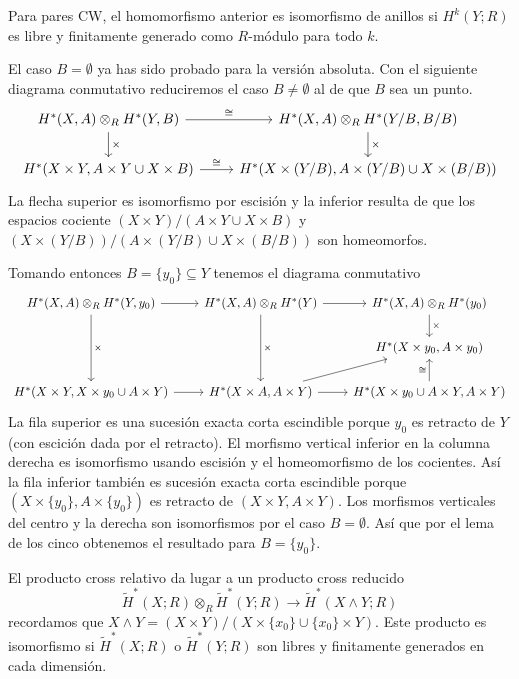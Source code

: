 \documentclass[TA.tex]{subfiles}
\begin{document}
\begin{teorema}
Para pares CW, el homomorfismo anterior es isomorfismo de anillos si $H^k(Y;R)$ es libre y finitamente generado como $R$-módulo para todo $k$. 
\end{teorema}
\begin{dem}
El caso $B=\emptyset$ ya has sido probado para la versión absoluta. Con el siguiente diagrama conmutativo reduciremos el caso $B\neq\emptyset$ al de que $B$ sea un punto. 
\[
\begin{tikzcd}
{H^*(X,A)\otimes_R H^*(Y,B) } \arrow[r, "\cong"] \arrow[d, "\times"] & {H^*(X,A)\otimes_R H^*(Y/B,B/B)} \arrow[d, "\times"] \\
{H^*(X\times Y,A\times Y\cup X\times B)} \arrow[r, "\cong"] & {H^*(X\times (Y/B), A\times (Y/B)\cup X\times (B/B))}
\end{tikzcd}
\]
La flecha superior es isomorfismo por escisión y la inferior resulta de que los espacios cociente $(X\times Y)/(A\times Y\cup X\times B)$ y $(X\times (Y/B))/(A\times (Y/B)\cup X\times (B/B))$ son homeomorfos. 

Tomando entonces $B=\{y_0\}\subseteq Y$ tenemos el diagrama conmutativo
\[
\begin{tikzcd}[column sep=20]
{H^*(X,A)\otimes_R H^*(Y,y_0)} \arrow[r] \arrow[dd, "\times"] & {H^*(X,A)\otimes_R H^*(Y)} \arrow[r] \arrow[dd, "\times"] & {H^*(X,A)\otimes_R H^*(y_0)} \arrow[d, "\times"] \\
 &  & {H^*(X\times y_0,A\times y_0)}  \\
{H^*(X\times Y,X\times y_0\cup A\times Y) } \arrow[r] & {H^*(X\times A,A\times Y)} \arrow[ru] \arrow[r] & {H^*(X\times y_0\cup A\times Y,A\times Y)}\arrow[u, "\cong"]
\end{tikzcd}
\]
La fila superior es una sucesión exacta corta escindible porque $y_0$ es retracto de $Y$ (con escición dada por el retracto). El morfismo vertical inferior en la columna derecha es isomorfismo usando escisión y el homeomorfismo de los cocientes. Así la fila inferior también es sucesión exacta corta escindible porque $(X\times \{y_0\},A\times\{y_0\})$ es retracto de $(X\times Y,A\times Y)$. Los morfismos verticales del centro y la derecha son isomorfismos por el caso $B=\emptyset$. Así que por el lema de los cinco obtenemos el resultado para $B=\{y_0\}$. 
\end{dem}

El producto cross relativo da lugar a un producto cross reducido 
\[
\widetilde{H}^*(X;R)\otimes_R\widetilde{H}^*(Y;R)\to \widetilde{H}^*(X\wedge Y;R)
\]
recordamos que $X\wedge Y=(X\times Y)/(X\times\{x_0\}\cup \{x_0\}\times Y)$. Este producto es isomorfismo si $\widetilde{H}^*(X;R)$ o $\widetilde{H}^*(Y;R)$ son libres y finitamente generados en cada dimensión.
\end{document}

